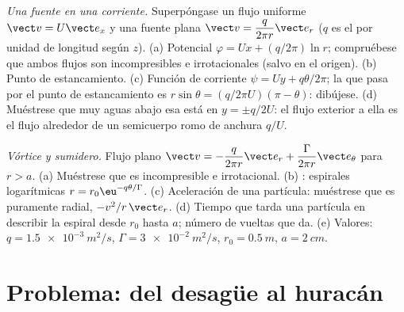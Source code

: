 \begin{exercise}[$\star\star\star$]\label{exo:b2:fluid-kinematics:11}
\emph{Una fuente en una corriente.} Superpóngase un flujo uniforme $\vect v = U\vect e_x$
y una fuente plana $\vect v = \dfrac{q}{2\pi r}\vect e_r$ ($q$ es el  por unidad de longitud según $z$). (a) Potencial $\varphi = Ux +
(q/2\pi)\ln r$; compruébese que ambos flujos son incompresibles e
irrotacionales (salvo en el origen). (b) Punto de estancamiento. (c) Función de corriente $\psi
= Uy + q\theta/2\pi$; la  que pasa por el punto de estancamiento es
$r\sin\theta = (q/2\pi U)(\pi - \theta)$: dibújese. (d) Muéstrese que muy
aguas abajo esa  está en $y = \pm q/2U$: el flujo exterior a ella es
el flujo alrededor de un semicuerpo romo de anchura $q/U$.
\end{exercise}

\begin{exercise}[$\star\star\star$]\label{exo:b2:fluid-kinematics:12}
\emph{Vórtice y sumidero.} Flujo plano $\vect v = -\dfrac{q}{2\pi r}\vect e_r +
\dfrac{\Gamma}{2\pi r}\vect e_\theta$ para $r > a$. (a) Muéstrese que es
incompresible e irrotacional. (b) : espirales logarítmicas
$r = r_0\eu^{-q\theta/\Gamma}$. (c) Aceleración de una partícula: muéstrese que es
puramente radial, $-v^2/r\,\vect e_r$. (d) Tiempo que tarda una partícula
en describir la espiral desde $r_0$ hasta $a$; número de vueltas que da. (e) Valores: $q =
\qty{1.5e-3}{m^2/s}$, $\Gamma = \qty{3e-2}{m^2/s}$, $r_0 = \qty{0.5}{m}$,
$a = \qty{2}{cm}$.
\end{exercise}

\section{Problema: del desagüe al huracán}

